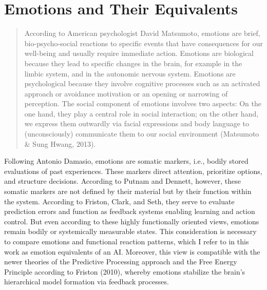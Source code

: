 \section*{Emotions and Their Equivalents}
\begin{quotation}
    According to American psychologist David Matsumoto, emotions are brief, bio-psycho-social reactions to specific events that have consequences for our well-being and usually require immediate action.
    Emotions are biological because they lead to specific changes in the brain, for example in the limbic system, and in the autonomic nervous system.
    Emotions are psychological because they involve cognitive processes such as an activated approach or avoidance motivation or an opening or narrowing of perception.
    The social component of emotions involves two aspects: On the one hand, they play a central role in social interaction; on the other hand, we express them outwardly via facial expressions and body language to (unconsciously) communicate them to our social environment (Matsumoto & Sung Hwang, 2013).
\end{quotation}

Following Antonio Damasio, emotions are somatic markers, i.e., bodily stored evaluations of past experiences.
These markers direct attention, prioritize options, and structure decisions.
According to Putnam and Dennett, however, these somatic markers are not defined by their material but by their function within the system.
According to Friston, Clark, and Seth, they serve to evaluate prediction errors and function as feedback systems enabling learning and action control.
But even according to these highly functionally oriented views, emotions remain bodily or systemically measurable states.
This consideration is necessary to compare emotions and functional reaction patterns, which I refer to in this work as emotion equivalents of an AI.
Moreover, this view is compatible with the newer theories of the Predictive Processing approach and the Free Energy Principle according to Friston (2010), whereby emotions stabilize the brain's hierarchical model formation via feedback processes.

